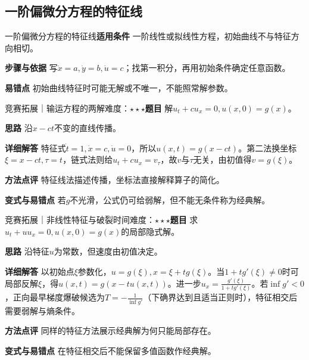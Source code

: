 \subsection{一阶偏微分方程的特征线}\label{deep:ode_qualitative_deep:pde}

\begin{method}{一阶偏微分方程的特征线}\textbf{适用条件} 一阶线性或拟线性方程，初始曲线不与特征方向相切。\par\textbf{步骤与依据} 写$\dot x=a,\dot y=b,\dot u=c$；找第一积分，再用初始条件确定任意函数。\par\textbf{易错点} 初始曲线特征时可能无解或不唯一，不能照常解参数。\end{method}

\begin{example}{竞赛拓展｜输运方程的两解}{难度：$\star\star\star$}\label{deep:ex:ode_qualitative_deep:transport}\textbf{题目} 解$u_t+cu_x=0,u(x,0)=g(x)$。\par\textbf{思路} 沿$x-ct$不变的直线传播。\par\textbf{详细解答} 特征式$\dot t=1,\dot x=c,\dot u=0$，所以$u(x,t)=g(x-ct)$。第二法换坐标$\xi=x-ct,\tau=t$，链式法则给$u_t+cu_x=v_\tau$，故$v$与$\tau$无关，由初值得$v=g(\xi)$。\par\textbf{方法点评} 特征线法描述传播，坐标法直接解释算子的简化。\par\textbf{变式与易错点} 若$g$不光滑，公式仍可给弱解，但不能无条件称为经典解。\end{example}

\begin{example}{竞赛拓展｜非线性特征与破裂时间}{难度：$\star\star\star$}\label{deep:ex:ode_qualitative_deep:quasilinear}\textbf{题目} 求$u_t+uu_x=0,u(x,0)=g(x)$的局部隐式解。\par\textbf{思路} 沿特征$u$为常数，但速度由初值决定。\par\textbf{详细解答} 以初始点$\xi$参数化，$u=g(\xi),x=\xi+t g(\xi)$。当$1+tg'(\xi)\ne0$时可局部反解$\xi$，得$u(x,t)=g(x-tu(x,t))$。进一步$u_x=\frac{g'(\xi)}{1+tg'(\xi)}$。若$\inf g'<0$，正向最早梯度爆破候选为$T=-\frac{1}{\inf g'}$（下确界达到且适当正则时），特征相交后需要弱解与熵条件。\par\textbf{方法点评} 同样的特征方法展示经典解为何只能局部存在。\par\textbf{变式与易错点} 在特征相交后不能保留多值函数作经典解。\end{example}
